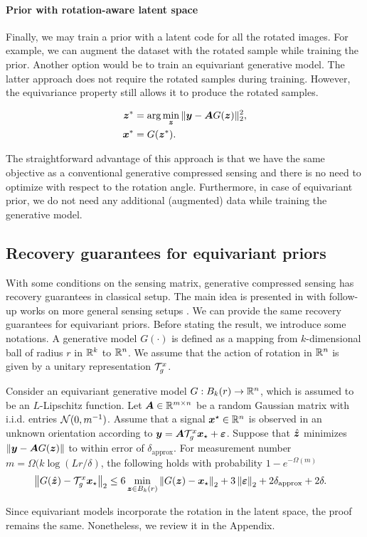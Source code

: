 \paragraph{Prior with rotation-aware latent space}
Finally, we may train a prior with a latent code for all the rotated images. For example, we can augment the dataset with the rotated sample while training the prior. Another option would be to train an equivariant generative model. The latter approach does not require the rotated samples during training. However, the equivariance property still allows it to produce the rotated samples. 

\begin{align}
    {\bm{z}}^* &= \arg\min_{{\bm{z}}} \|{\bm{y}} - {\bm{A}} G({\bm{z}})\|_2^2,\\
    {\bm{x}}^{*} &= G({\bm{z}}^*).
\end{align}

The straightforward advantage of this approach is that we have the same objective as a conventional generative compressed sensing and there is no need to optimize with respect to the rotation angle. Furthermore, in case of equivariant prior, we do not need any additional (augmented) data while training the generative model.

\subsection{Recovery guarantees for equivariant priors}
With some conditions on the sensing matrix, generative  compressed sensing has recovery guarantees in classical setup. The main idea is presented in \citet{Bora2017-as} with follow-up works on more general sensing setups \cite{liu_generalized_2020, liu_sample_2020}. We can provide the same recovery guarantees for equivariant priors. Before stating the result, we introduce some notations. A generative model $G(\cdot)$ is defined as a mapping from $k$-dimensional ball of radius $r$ in $\mathbb{R}^k$ to $\mathbb{R}^n$. We assume that the action of rotation in $\mathbb{R}^n$ is given by a unitary representation ${{\mathcal{T}}_g^x}$.

\begin{theorem}
Consider an equivariant generative model $G: B_k(r)\to\mathbb{R}^n$, which is assumed to be an $L$-Lipschitz function. 
Let ${\bm{A}}\in\mathbb{R}^{m\times n}$ be a random Gaussian matrix with i.i.d. entries ${\mathcal{N}}(0,m^{-1})$. 
Assume that a signal ${\bm{x}}^\star\in\mathbb{R}^n$ is observed in an unknown orientation according to ${\bm{y}} = {\bm{A}} {\mathcal{T}}_g^x {\bm{x}}_\star + {\bm{\varepsilon}}$. 
Suppose that $\hat{{\bm{z}}}$ minimizes $\left\|{\bm{y}}-{\bm{A}} G({\bm{z}})\right\|$ to within error of $\delta_{\text{approx}}$.
For measurement  number $m =\Omega(k \log (Lr/\delta)$, the following holds with probability $1-e^{-\Omega(m)}$
\begin{align*}
&\left\|G(\hat{{\bm{z}}})-{\mathcal{T}}_g^x {\bm{x}}_\star\right\|_2  \leq  6 \min_{{\bm{z}}\in B_k(r)}\left\|G({\bm{z}})-{\bm{x}}_\star\right\|_2 + 3\left\|{\bm{\varepsilon}}\right\|_2 + 2\delta_{\text{approx}} + 2\delta.
\end{align*}
\label{thm:equivmodel}
\end{theorem}
Since equivariant models incorporate the rotation in the latent space, the proof remains the same. Nonetheless, we review it in the Appendix.

